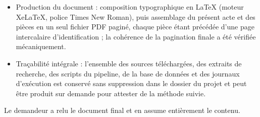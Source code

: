 \documentclass[12pt,a4paper]{article}
\begin{document}
\begin{itemize}
  \item Production du document : composition typographique en LaTeX (moteur XeLaTeX, police Times New Roman), puis assemblage du présent acte et des pièces en un seul fichier PDF paginé, chaque pièce étant précédée d’une page intercalaire d’identification ; la cohérence de la pagination finale a été vérifiée mécaniquement.
  \item Traçabilité intégrale : l’ensemble des sources téléchargées, des extraits de recherche, des scripts du pipeline, de la base de données et des journaux d’exécution est conservé sans suppression dans le dossier du projet et peut être produit sur demande pour attester de la méthode suivie.
\end{itemize}

Le demandeur a relu le document final et en assume entièrement le contenu.
\end{document}
